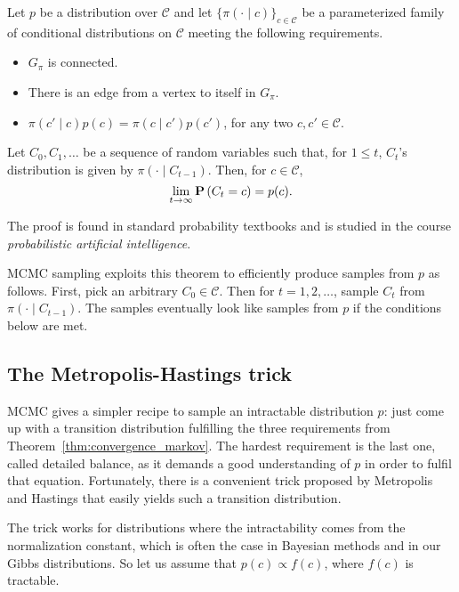 \begin{theorem}
Let $p$ be a distribution over $\mathcal{C}$ and let $\{\pi(\cdot \mid c)\}_{c \in \mathcal{C}}$ be a parameterized
family of conditional distributions on $\mathcal{C}$ meeting the following
requirements.

\begin{itemize}
\item $G_\pi$ is connected.
\item There is an edge from a vertex to itself in $G_\pi$.
\item $\pi(c' \mid c)p(c) = \pi(c \mid c')p(c')$, for any two $c, c' \in \mathcal{C}$.
\end{itemize}

Let $C_0, C_1, \ldots$ be a sequence of random variables such that, for $1 \leq t$,
$C_t$'s distribution is given by $\pi(\cdot \mid C_{t-1})$. Then, for $c \in \mathcal{C}$,
%
\begin{equation}
\lim_{t \to \infty} \mathbf{P}\left(C_t = c\right) = p(c).
\end{equation}
%
\label{thm:convergence_markov}
\end{theorem}

The proof is found in standard probability textbooks and is studied in
the course \emph{probabilistic artificial intelligence}.

MCMC sampling exploits this theorem to efficiently produce samples from $p$ as follows. 
First, pick an arbitrary $C_0 \in \mathcal{C}$. Then for $t = 1, 2, \ldots$, sample $C_t$ from $\pi\left(\cdot \mid C_{t-1}\right)$. The samples eventually look like samples from $p$ if the conditions
below are met.

\subsection{The Metropolis-Hastings trick}

MCMC gives a simpler recipe to sample an intractable distribution $p$: just
come up with a transition distribution fulfilling the three requirements
from Theorem~\ref{thm:convergence_markov}. The hardest requirement is the last one, called detailed
balance, as it demands a good understanding of $p$ in order to fulfil that
equation. Fortunately, there is a convenient trick proposed by Metropolis
and Hastings that easily yields such a transition distribution.

The trick works for distributions where the intractability comes from
the normalization constant, which is often the case in Bayesian methods
and in our Gibbs distributions. So let us assume that $p(c) \propto f(c)$, where
$f(c)$ is tractable.

